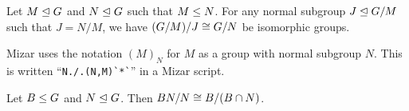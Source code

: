 \begin{theorem}
Let $M\trianglelefteq G$ and $N\trianglelefteq G$ such that $M\leq N$.
For any normal subgroup $J\trianglelefteq G/M$ such that $J=N/M$,
we have $(G/M)/J\cong G/N$ be isomorphic groups.
\end{theorem}

\begin{thm-remark}
Mizar uses the notation $(M)_{N}$ for $M$ as a group with normal
subgroup $N$. This is written ``\lstinline{N./.(N,M)`*`}'' in a Mizar script.
\end{thm-remark}

\begin{theorem}
Let $B\leq G$ and $N\trianglelefteq G$.
Then $BN/N\cong B/(B\cap N)$.
\end{theorem}

